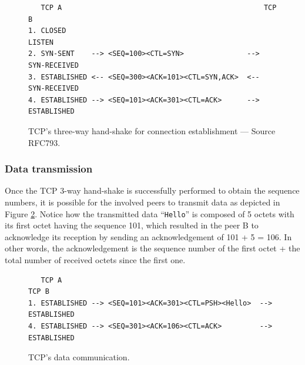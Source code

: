 \documentclass[pdftex,12pt,a4paper]{article}
\begin{document}
                \begin{figure}[tbh]
                        \centering
                        \small\begin{verbatim}   TCP A                                                TCP B
1. CLOSED                                               LISTEN
2. SYN-SENT    --> <SEQ=100><CTL=SYN>               --> SYN-RECEIVED
3. ESTABLISHED <-- <SEQ=300><ACK=101><CTL=SYN,ACK>  <-- SYN-RECEIVED
4. ESTABLISHED --> <SEQ=101><ACK=301><CTL=ACK>      --> ESTABLISHED\end{verbatim}\normalsize
                \vspace{-15pt}
                \caption{TCP's three-way hand-shake for connection
                establishment --- Source RFC793.}
                \label{fig:tcpsyn}
                \end{figure}

            \subsubsection{Data transmission}
                Once the TCP 3-way hand-shake is successfully performed to
                obtain the sequence numbers, it is possible for the involved
                peers to transmit data as depicted in Figure \ref{fig:tcppsh}.
                Notice how the transmitted data ``\texttt{Hello}'' is composed
                of 5 octets with its first octet having the sequence 101, which
                resulted in the peer B to acknowledge its  reception by sending
                an acknowledgement of 101 + 5 = 106. In other words, the
                acknowledgement is the sequence number of the first octet +
                the total number of received octets since the first one.

                \begin{figure}[tbh]
                        \centering
                        \small\begin{verbatim}   TCP A                                                   TCP B
1. ESTABLISHED --> <SEQ=101><ACK=301><CTL=PSH><Hello>  --> ESTABLISHED
4. ESTABLISHED --> <SEQ=301><ACK=106><CTL=ACK>         --> ESTABLISHED\end{verbatim}\normalsize
                \vspace{-15pt}
                \caption{TCP's data communication.}
                \label{fig:tcppsh}
                \end{figure}
\end{document}

